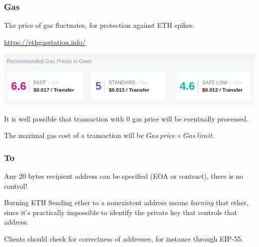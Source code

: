 \documentclass[11pt]{beamer}  %
\begin{document}
\begin{frame}\frametitle{Gas}

  The price of gas fluctuates, for protection against ETH spikes.

  \bigskip

  \begin{greenbox}{\url{https://ethgasstation.info/}}
    \begin{center}
      \includegraphics[width=\textwidth,clip=false]{pictures/ethgasstation.png}
    \end{center}
  \end{greenbox}

  \bigskip

  It is well possible that transaction with $0$ gas price will be eventually
  processed.

  \bigskip

  The maximal gas cost of a transaction will be $\mathit{Gas\ price}\times\mathit{Gas\ limit}$.
\end{frame}

\begin{frame}\frametitle{To}

  Any $20$ bytes recipient address can be specified (EOA or contract),
  there is no control!

  \bigskip

  \begin{redbox}{Burning ETH}
    Sending ether to a nonexistent address means \emph{burning} that ether,
    since it's practically impossible to identify the private key
    that controls that address.
  \end{redbox}

  \bigskip

  Clients should check for correctness of addresses, for instance
  through EIP-55.
\end{frame}
\end{document}
